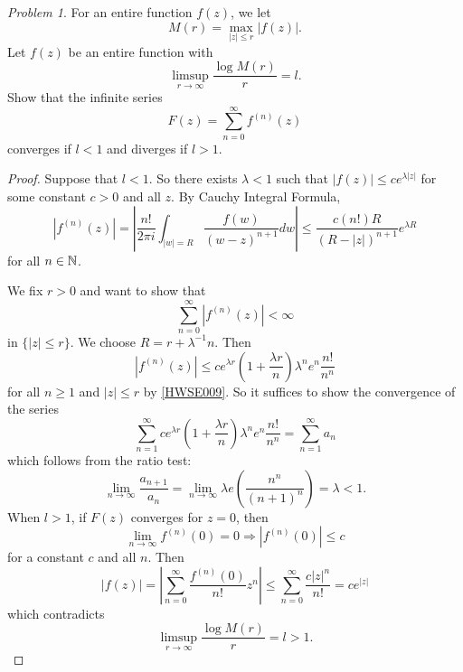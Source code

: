 \documentclass[11pt]{amsart}
\theoremstyle{remark}
\newtheorem{prob}{Problem}[section]
\theoremstyle{definition}
\numberwithin{equation}{section}
\begin{document}
\begin{prob}
    For an entire function $f(z)$, we let
    \[
        M(r) = \max_{|z| \le r} |f(z)|.
    \]
    Let $f(z)$ be an entire function with
    \[
        \limsup_{r\to\infty} \frac{\log M(r)}{r} = l.
    \]
    Show that the infinite series
    \[
        F(z) = \sum_{n=0}^\infty f^{(n)}(z)
    \]
    converges if $l < 1$ and diverges if $l > 1$.
\end{prob}

\begin{proof}
    Suppose that $l < 1$. So there exists $\lambda < 1$ such that $|f(z)| \le c e^{\lambda |z|}$ for some constant $c > 0$ and all $z$. By Cauchy Integral Formula,
    \begin{equation}\label{HWSE009}
        |f^{(n)}(z)| = \left|\frac{n!}{2\pi i} \int_{|w| = R} \frac{f(w)}{(w-z)^{n+1}} dw\right|
        \le \frac{c (n!) R}{(R - |z|)^{n+1}} e^{\lambda R}
    \end{equation}
    for all $n\in {\mathbb N}$.

    We fix $r > 0$ and want to show that
    \begin{equation}\label{HWSE011}
        \sum_{n=0}^\infty |f^{(n)}(z)| < \infty
    \end{equation}
    in $\{|z| \le r\}$. We choose $R = r + \lambda^{-1} n$. Then
    \begin{equation}\label{HWSE010}
        |f^{(n)}(z)|
        \le c e^{\lambda r}\left(1 + \frac{\lambda r}{n}\right)  \lambda^n e^{n}  \frac{n!}{n^n}
    \end{equation}
    for all $n\ge 1$ and $|z| \le r$ by \eqref{HWSE009}. So it suffices to show the convergence
    of the series
    \begin{equation}\label{HWSE000}
        \sum_{n=1}^\infty c e^{\lambda r}\left(1 + \frac{\lambda r}{n}\right)  \lambda^n e^{n}  \frac{n!}{n^n} = \sum_{n=1}^\infty a_n
    \end{equation}
    which follows from the ratio test:
    \begin{equation}\label{HWSE001}
        \lim_{n\to\infty}
        \frac{a_{n+1}}{a_n} = \lim_{n\to\infty} \lambda e \left(\frac{n^n}{(n+1)^n}\right) = \lambda < 1.
    \end{equation}
    When $l > 1$, if $F(z)$ converges for $z = 0$, then
    \begin{equation}\label{HWSE002}
        \lim_{n\to\infty} f^{(n)}(0) = 0 \Rightarrow |f^{(n)}(0)| \le c
    \end{equation}
    for a constant $c$ and all $n$. Then
    \begin{equation}\label{HWSE003}
        |f(z)| = \left|\sum_{n=0}^\infty \frac{f^{(n)}(0)}{n!} z^n\right|
        \le \sum_{n=0}^\infty \frac{c |z|^n}{n!} = c e^{|z|}
    \end{equation}
    which contradicts
    \begin{equation}\label{HWSE004}
        \limsup_{r\to\infty} \frac{\log M(r)}{r} = l > 1.
    \end{equation}
\end{proof}
\end{document}
